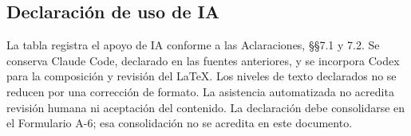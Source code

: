 \clearpage
\begin{landscape}
\setlength{\textwidth}{\linewidth}
\section*{Declaración de uso de IA}

La tabla registra el apoyo de IA conforme a las Aclaraciones, §§7.1 y 7.2. Se conserva Claude Code, declarado en las fuentes anteriores, y se incorpora Codex para la composición y revisión del LaTeX. Los niveles de texto declarados no se reducen por una corrección de formato. La asistencia automatizada no acredita revisión humana ni aceptación del contenido. La declaración debe consolidarse en el Formulario A-6; esa consolidación no se acredita en este documento.


\end{landscape}
